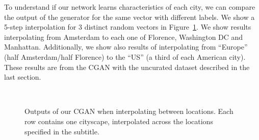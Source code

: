 \documentclass[a4paper]{article}
\begin{document}
To understand if our network learns characteristics of each city, we can compare the output of the generator for the same vector with different labels.
We show a 5-step interpolation for 3 distinct random vectors in Figure~\ref{fig:transfer}.
We show results interpolating from Amsterdam to each one of Florence, Washington DC and Manhattan.
Additionally, we show also results of interpolating from ``Europe'' (half Amsterdam/half Florence) to the ``US'' (a third of each American city).
These results are from the CGAN with the uncurated dataset described in the last section.

\begin{figure}[h]
	\centering
	\hspace{0.01\linewidth}
	\\
	\hspace{0.01\linewidth}
	\caption{Outputs of our CGAN when interpolating between locations.
	Each row contains one cityscape, interpolated across the locations specified in the subtitle.
}
	\label{fig:transfer}
\end{figure}
\end{document}
